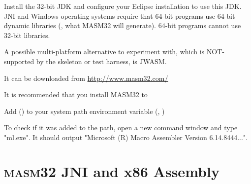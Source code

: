 \item Install the 32-bit JDK and configure your Eclipse installation to use this JDK. JNI and Windows operating systems require that 64-bit programs use 64-bit dynamic libraries (\ie, what MASM32 will generate). 64-bit programs cannot use 32-bit libraries. 

\item A possible multi-platform alternative to experiment with, which is NOT-supported by the skeleton or test harness, is JWASM.

\item It can be downloaded from \url{http://www.masm32.com/}

\item It is recommended that you install MASM32 to 

\item Add () to your system path environment variable (\ie, )

\item To check if it was added to the path, open a new command window and type "ml.exe". It should output "Microsoft (R) Macro Assembler Version 6.14.8444...".

\ei

\section{\textsc{masm32} JNI and x86 Assembly}

